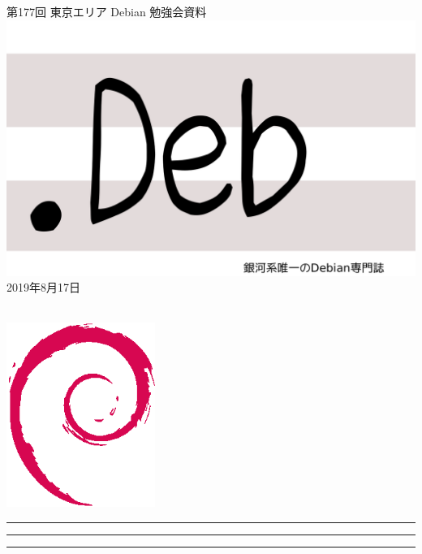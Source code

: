 \documentclass[mingoth,a4paper]{jsarticle}
\newcommand{\debmtgyear}{2019}
\newcommand{\debmtgmonth}{8}
\newcommand{\debmtgdate}{17}
\newcommand{\debmtgnumber}{177}
\begin{document}
\begin{titlepage}
\thispagestyle{empty}

\vspace*{-2cm}
第\debmtgnumber{}回 東京エリア Debian 勉強会資料\\
\hspace*{-2cm}
\includegraphics{image2012-natsu/dotdeb.pdf}\\
\hfill{}\debmtgyear{}年\debmtgmonth{}月\debmtgdate{}日

\\

\vspace*{-2cm}
\hfill{}\includegraphics[height=6cm]{image200502/openlogo-nd.eps}
\end{titlepage}

\newpage

\begin{minipage}[b]{0.2\hsize}
 \colorbox{titleback}{}
\end{minipage}
\begin{minipage}[b]{0.8\hsize}
\hrule
\vspace{2mm}
\hrule
\begin{multicols}{2}
\tableofcontents
\end{multicols}
\vspace{2mm}
\hrule
\end{minipage}
\end{document}
